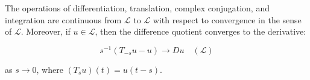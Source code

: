The operations of differentiation, translation, complex conjugation, and integration are continuous from $\mathcal{L}$ to $\mathcal{L}$ with respect to convergence in the sense of $\mathcal{L}$. Moreover, if $u \in \mathcal{L}$, then the difference quotient converges to the derivative:

$$s^{-1}(T_{-s}u - u) \to Du \quad (\mathcal{L})$$

as $s \to 0$, where $(T_s u)(t) = u(t - s)$.

